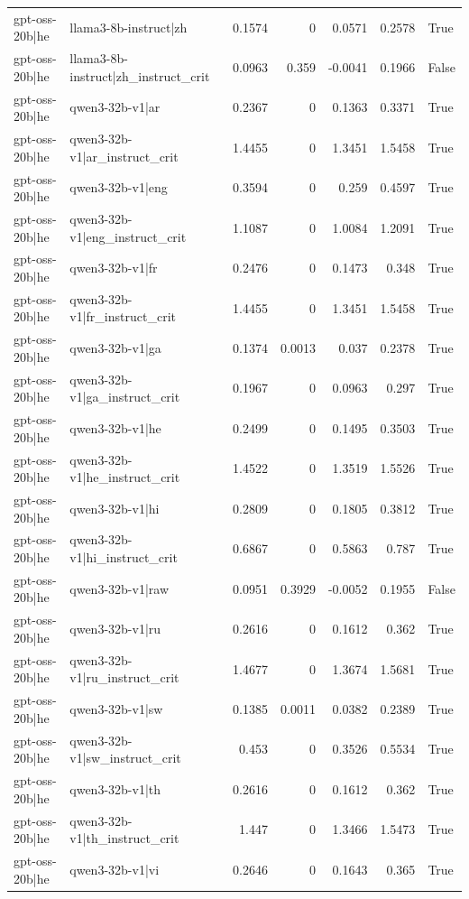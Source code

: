\begin{table}
\begin{tabular}{l l r r r r l}
gpt-oss-20b|he & llama3-8b-instruct|zh & 0.1574 & 0 & 0.0571 & 0.2578 & True \\
gpt-oss-20b|he & llama3-8b-instruct|zh_instruct_crit & 0.0963 & 0.359 & -0.0041 & 0.1966 & False \\
gpt-oss-20b|he & qwen3-32b-v1|ar & 0.2367 & 0 & 0.1363 & 0.3371 & True \\
gpt-oss-20b|he & qwen3-32b-v1|ar_instruct_crit & 1.4455 & 0 & 1.3451 & 1.5458 & True \\
gpt-oss-20b|he & qwen3-32b-v1|eng & 0.3594 & 0 & 0.259 & 0.4597 & True \\
gpt-oss-20b|he & qwen3-32b-v1|eng_instruct_crit & 1.1087 & 0 & 1.0084 & 1.2091 & True \\
gpt-oss-20b|he & qwen3-32b-v1|fr & 0.2476 & 0 & 0.1473 & 0.348 & True \\
gpt-oss-20b|he & qwen3-32b-v1|fr_instruct_crit & 1.4455 & 0 & 1.3451 & 1.5458 & True \\
gpt-oss-20b|he & qwen3-32b-v1|ga & 0.1374 & 0.0013 & 0.037 & 0.2378 & True \\
gpt-oss-20b|he & qwen3-32b-v1|ga_instruct_crit & 0.1967 & 0 & 0.0963 & 0.297 & True \\
gpt-oss-20b|he & qwen3-32b-v1|he & 0.2499 & 0 & 0.1495 & 0.3503 & True \\
gpt-oss-20b|he & qwen3-32b-v1|he_instruct_crit & 1.4522 & 0 & 1.3519 & 1.5526 & True \\
gpt-oss-20b|he & qwen3-32b-v1|hi & 0.2809 & 0 & 0.1805 & 0.3812 & True \\
gpt-oss-20b|he & qwen3-32b-v1|hi_instruct_crit & 0.6867 & 0 & 0.5863 & 0.787 & True \\
gpt-oss-20b|he & qwen3-32b-v1|raw & 0.0951 & 0.3929 & -0.0052 & 0.1955 & False \\
gpt-oss-20b|he & qwen3-32b-v1|ru & 0.2616 & 0 & 0.1612 & 0.362 & True \\
gpt-oss-20b|he & qwen3-32b-v1|ru_instruct_crit & 1.4677 & 0 & 1.3674 & 1.5681 & True \\
gpt-oss-20b|he & qwen3-32b-v1|sw & 0.1385 & 0.0011 & 0.0382 & 0.2389 & True \\
gpt-oss-20b|he & qwen3-32b-v1|sw_instruct_crit & 0.453 & 0 & 0.3526 & 0.5534 & True \\
gpt-oss-20b|he & qwen3-32b-v1|th & 0.2616 & 0 & 0.1612 & 0.362 & True \\
gpt-oss-20b|he & qwen3-32b-v1|th_instruct_crit & 1.447 & 0 & 1.3466 & 1.5473 & True \\
gpt-oss-20b|he & qwen3-32b-v1|vi & 0.2646 & 0 & 0.1643 & 0.365 & True \\

\end{tabular}
\end{table}
